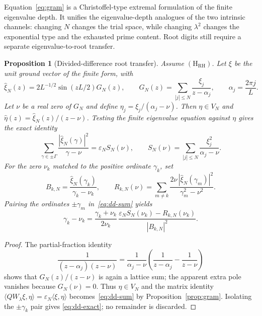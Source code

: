 \documentclass[11pt,a4paper]{article}
\newtheorem{proposition}{Proposition}
\begin{document}
Equation~\eqref{eq:gram} is a Christoffel-type extremal formulation of the
finite eigenvalue depth. It unifies the eigenvalue-depth analogues of the two
intrinsic channels: changing $N$ changes the trial space, while changing
$\lambda^2$ changes the exponential type and the exhausted prime content.
Root digits still require a separate eigenvalue-to-root transfer.

\begin{proposition}[Divided-difference root transfer]
\label{prop:dd}
Assume $(\mathrm{H}_{\mathrm{RH}})$. Let $\xi$ be the unit ground vector of the
finite form, with
\[
 \widehat\xi_N(z)=2L^{-1/2}\sin(zL/2)G_N(z),\qquad
 G_N(z)=\sum_{|j|\le N}\frac{\xi_j}{z-\alpha_j},\qquad
 \alpha_j=\frac{2\pi j}{L}.
\]
Let $\nu$ be a real zero of $G_N$ and define
$\eta_j=\xi_j/(\alpha_j-\nu)$. Then $\eta\in V_N$ and
$\widehat\eta(z)=\widehat\xi_N(z)/(z-\nu)$. Testing the finite eigenvalue
equation against $\eta$ gives the exact identity
\begin{equation}\label{eq:dd-sum}
 \sum_{\gamma\in\pm\Gamma}
 \frac{|\widehat\xi_N(\gamma)|^2}{\gamma-\nu}
 =\varepsilon_N S_N(\nu),
 \qquad
 S_N(\nu)=\sum_{|j|\le N}\frac{\xi_j^2}{\alpha_j-\nu}.
\end{equation}
For the zero $\nu_k$ matched to the positive ordinate $\gamma_k$, set
\[
 B_{k,N}=\frac{\widehat\xi_N(\gamma_k)}{\gamma_k-\nu_k},\qquad
 R_{k,N}(\nu)=\sum_{m\ne k}
 \frac{2\nu\,|\widehat\xi_N(\gamma_m)|^2}{\gamma_m^2-\nu^2}.
\]
Pairing the ordinates $\pm\gamma_m$ in~\eqref{eq:dd-sum} yields
\begin{equation}\label{eq:dd-exact}
 \boxed{
 \gamma_k-\nu_k=
 \frac{\gamma_k+\nu_k}{2\nu_k}\,
 \frac{\varepsilon_N S_N(\nu_k)-R_{k,N}(\nu_k)}{|B_{k,N}|^2}.}
\end{equation}
\end{proposition}

\begin{proof}
The partial-fraction identity
\[
 \frac{1}{(z-\alpha_j)(z-\nu)}
 =\frac{1}{\alpha_j-\nu}
 \left(\frac{1}{z-\alpha_j}-\frac{1}{z-\nu}\right)
\]
shows that $G_N(z)/(z-\nu)$ is again a lattice sum; the apparent extra pole
vanishes because $G_N(\nu)=0$. Thus $\eta\in V_N$ and the matrix identity
$\langle QW_\lambda\xi,\eta\rangle=
\varepsilon_N\langle\xi,\eta\rangle$ becomes~\eqref{eq:dd-sum} by
Proposition~\ref{prop:gram}. Isolating the $\pm\gamma_k$ pair gives
\eqref{eq:dd-exact}; no remainder is discarded.
\end{proof}
\end{document}
